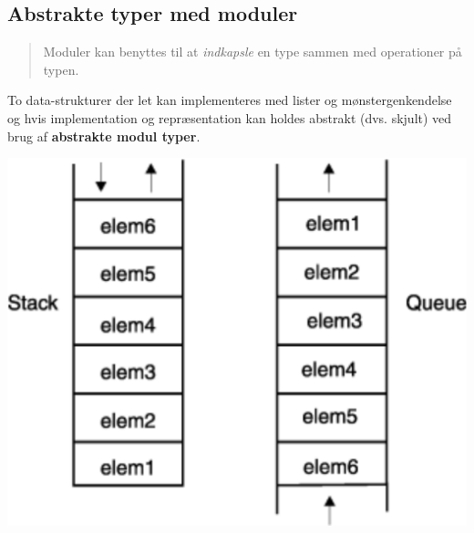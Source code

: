 \documentclass[rgb]{beamer}
\begin{document}
\begin{frame}[fragile]
\begin{footnotesize}
\end{footnotesize}
\end{frame}


\subsection{Abstrakte typer med moduler}

\begin{frame}[fragile]
\begin{footnotesize}


  \begin{quote}Moduler kan benyttes til at \emph{indkapsle} en type sammen med operationer på typen.
  \end{quote}

  \vspace{2mm}
\begin{minipage}[t]{0.53\textwidth}
  \vspace{0pt}

    To data-strukturer der let kan implementeres med lister og
    mønstergenkendelse og hvis implementation og repræsentation kan
    holdes abstrakt (dvs. skjult) ved brug af \textbf{abstrakte modul typer}.
\end{minipage}
\hfill
\begin{minipage}[t]{0.4\textwidth}
  \vspace{0pt}
  \includegraphics[width=\textwidth]{../images/lifofifo.png}
\end{minipage}
\end{footnotesize}
\end{frame}
\end{document}

